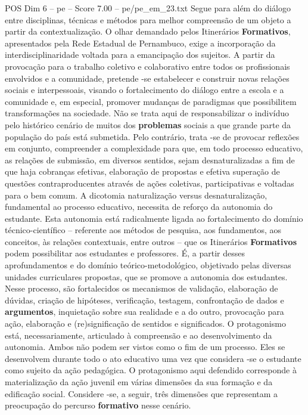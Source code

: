 \begin{textsample}{POS Dim 6 – pe – Score 7.00 – pe/pe\_em\_23.txt}
Segue para além do diálogo entre disciplinas, técnicas e métodos para melhor compreensão de um objeto a partir da contextualização.
O olhar demandado pelos Itinerários \textbf{Formativos}, apresentados pela Rede Estadual de Pernambuco, exige a incorporação da interdisciplinaridade voltada para a emancipação dos sujeitos.
A partir da provocação para o trabalho coletivo e colaborativo entre todos os profissionais envolvidos e a comunidade, pretende -se estabelecer e construir novas relações sociais e interpessoais, visando o fortalecimento do diálogo entre a escola e a comunidade e, em especial, promover mudanças de paradigmas que possibilitem transformações na sociedade.
Não se trata aqui de responsabilizar o indivíduo pelo histórico cenário de muitos dos \textbf{problemas} sociais a que grande parte da população do país está submetida.
Pelo contrário, trata -se de provocar reflexões em conjunto, compreender a complexidade para que, em todo processo educativo, as relações de submissão, em diversos sentidos, sejam desnaturalizadas a fim de que haja cobranças efetivas, elaboração de propostas e efetiva superação de questões contraproducentes através de ações coletivas, participativas e voltadas para o bem comum.
A dicotomia naturalização versus desnaturalização, fundamental ao processo educativo, necessita de reforço da autonomia do estudante.
Esta autonomia está radicalmente ligada ao fortalecimento do domínio técnico-científico – referente aos métodos de pesquisa, aos fundamentos, aos conceitos, às relações contextuais, entre outros – que os Itinerários \textbf{Formativos} podem possibilitar aos estudantes e professores.
É, a partir desses aprofundamentos e do domínio teórico-metodológico, objetivado pelas diversas unidades curriculares propostas, que se promove a autonomia dos estudantes.
Nesse processo, são fortalecidos os mecanismos de validação, elaboração de dúvidas, criação de hipóteses, verificação, testagem, confrontação de dados e \textbf{argumentos}, inquietação sobre sua realidade e a do outro, provocação para ação, elaboração e (re)significação de sentidos e significados.
O protagonismo está, necessariamente, articulado à compreensão e ao desenvolvimento da autonomia.
Ambos não podem ser vistos como o fim de um processo.
Eles se desenvolvem durante todo o ato educativo uma vez que considera -se o estudante como sujeito da ação pedagógica.
O protagonismo aqui defendido corresponde à materialização da ação juvenil em várias dimensões da sua formação e da edificação social.
Considere -se, a seguir, três dimensões que representam a preocupação do percurso \textbf{formativo} nesse cenário.

\end{textsample}
